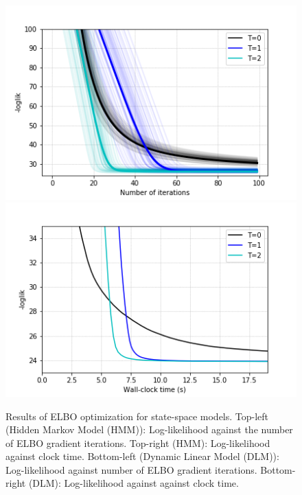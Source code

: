 \begin{figure}[h]
%
  \includegraphics[width=\linewidth]{img/dlm_results.png}
 \endminipage
  \includegraphics[width=\linewidth]{img/dlm_times.png}
\endminipage
\caption{Results of ELBO optimization for state-space models. Top-left (Hidden Markov Model (HMM)): Log-likelihood against the number of ELBO gradient iterations. Top-right (HMM): Log-likelihood against clock time. Bottom-left (Dynamic Linear Model (DLM)): Log-likelihood against number of ELBO gradient iterations. Bottom-right (DLM): Log-likelihood against against clock time.}\label{fig:ss}%
\end{figure}
   

